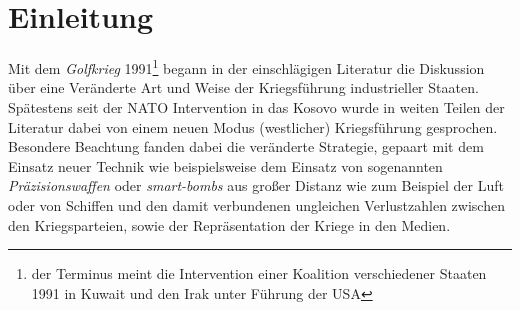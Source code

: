 \documentclass[11pt,a4paper,oneside,numbers=noenddot,bibliography=totocnumbered,DIV=13]{scrartcl}
\begin{document}
\section{Einleitung}
Mit dem \textit{Golfkrieg} 1991\footnote{der Terminus meint die Intervention einer Koalition verschiedener Staaten 1991 in Kuwait und den Irak unter Führung der USA} begann in der einschlägigen Literatur die Diskussion über eine Veränderte Art und Weise der Kriegsführung industrieller Staaten. 
Spätestens seit der NATO Intervention in das Kosovo wurde in weiten Teilen der Literatur dabei von einem neuen Modus (westlicher) Kriegsführung gesprochen. 
Besondere Beachtung fanden dabei die veränderte Strategie, gepaart mit dem Einsatz neuer Technik wie beispielsweise dem Einsatz von sogenannten \textit{Präzisionswaffen} oder \textit{smart-bombs} aus großer Distanz wie zum Beispiel der Luft oder von Schiffen und den damit verbundenen ungleichen Verlustzahlen zwischen den Kriegsparteien, sowie der Repräsentation der Kriege in den Medien. 
%

\newpage
\end{document}

